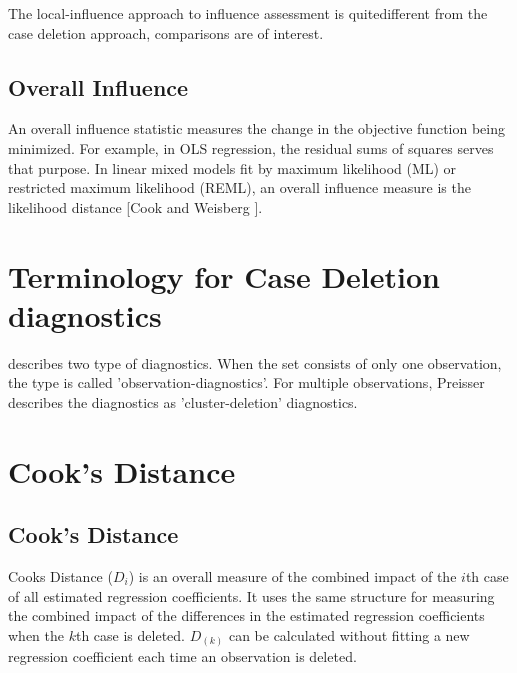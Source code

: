 \documentclass[12pt, a4paper]{article}
\begin{document}
The local-influence approach to influence assessment is quitedifferent from the case deletion approach, comparisons are of
interest.


\subsection{Overall Influence}
An overall influence statistic measures the change in the objective function being minimized. For example, in
OLS regression, the residual sums of squares serves that purpose. In linear mixed models fit by
 maximum likelihood (ML) or  restricted maximum likelihood (REML), an overall influence measure is the  likelihood distance [Cook and Weisberg ].

\newpage
\section{Terminology for Case Deletion diagnostics} %

\citet{preisser} describes two type of diagnostics. When the set consists of only one observation, the type is called
'observation-diagnostics'. For multiple observations, Preisser describes the diagnostics as 'cluster-deletion' diagnostics.



\newpage
\section{Cook's Distance} %

\subsection{Cook's Distance}%
Cooks Distance ($D_{i}$) is an overall measure of the combined impact of the $i$th case of all estimated regression coefficients. It uses the same structure for measuring the combined impact of the differences in the estimated regression coefficients when the $k$th case is deleted. $D_{(k)}$ can be calculated without fitting
a new regression coefficient each time an observation is deleted.
\end{document}
